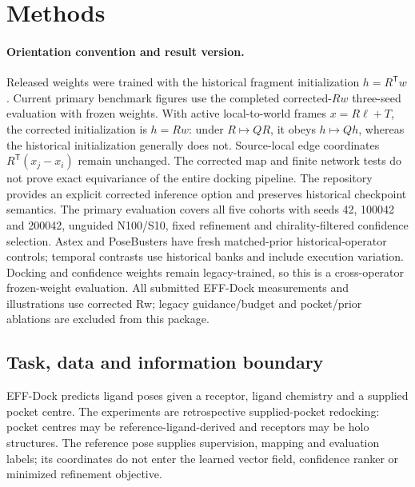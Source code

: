 \section{Methods}
\label{sec:effdock-methods}


\paragraph{Orientation convention and result version.}
Released weights were trained with the historical
fragment initialization $h=R^{\mathsf T}w$. Current primary benchmark
figures use the completed corrected-$Rw$ three-seed evaluation with frozen weights.
With active local-to-world
frames $x=R\ell+T$, the corrected initialization is $h=Rw$:
under $R\mapsto QR$, it obeys $h\mapsto Qh$, whereas the historical
initialization generally does not. Source-local edge coordinates
$R^{\mathsf T}(x_j-x_i)$ remain unchanged. The corrected map and finite
network tests do not prove exact equivariance of the entire docking pipeline.
The repository provides an explicit corrected inference option and preserves
historical checkpoint semantics. The primary evaluation covers all five cohorts
with seeds 42, 100042 and 200042, unguided N100/S10, fixed refinement and
chirality-filtered confidence selection. Astex and PoseBusters have fresh
matched-prior historical-operator controls; temporal contrasts use historical
banks and include execution variation. Docking and confidence weights remain
legacy-trained, so this is a cross-operator frozen-weight evaluation.
All submitted EFF-Dock measurements and illustrations use corrected Rw;
legacy guidance/budget and pocket/prior ablations are excluded from this package.

\subsection{Task, data and information boundary}
EFF-Dock predicts ligand poses given a receptor, ligand chemistry and a
supplied pocket centre. The experiments are retrospective supplied-pocket
redocking: pocket centres may be reference-ligand-derived and receptors may
be holo structures. The reference pose supplies supervision, mapping and
evaluation labels; its coordinates do not enter the learned vector field,
confidence ranker or minimized refinement objective.

